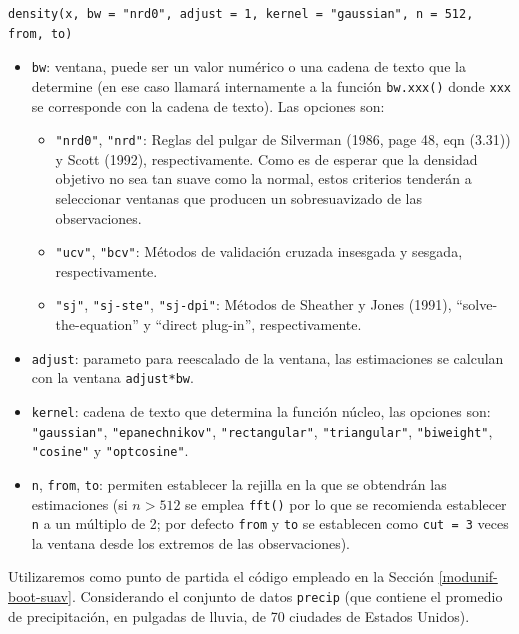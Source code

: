 \documentclass[
]{book}
\theoremstyle{break}
\theoremstyle{nonumberplain}
\begin{document}
\begin{verbatim}
density(x, bw = "nrd0", adjust = 1, kernel = "gaussian", n = 512, from, to)
\end{verbatim}

\begin{itemize}
\item
  \texttt{bw}: ventana, puede ser un valor numérico o una cadena de texto que la determine
  (en ese caso llamará internamente a la función \texttt{bw.xxx()} donde \texttt{xxx} se corresponde
  con la cadena de texto). Las opciones son:

  \begin{itemize}
  \item
    \texttt{"nrd0"}, \texttt{"nrd"}: Reglas del pulgar de Silverman (1986, page 48, eqn (3.31)) y
    Scott (1992), respectivamente. Como es de esperar que la densidad objetivo
    no sea tan suave como la normal, estos criterios tenderán a seleccionar
    ventanas que producen un sobresuavizado de las observaciones.
  \item
    \texttt{"ucv"}, \texttt{"bcv"}: Métodos de validación cruzada insesgada y sesgada, respectivamente.
  \item
    \texttt{"sj"}, \texttt{"sj-ste"}, \texttt{"sj-dpi"}: Métodos de Sheather y Jones (1991),
    ``solve-the-equation'' y ``direct plug-in'', respectivamente.
  \end{itemize}
\item
  \texttt{adjust}: parameto para reescalado de la ventana, las estimaciones se calculan
  con la ventana \texttt{adjust*bw}.
\item
  \texttt{kernel}: cadena de texto que determina la función núcleo, las opciones son: \texttt{"gaussian"},
  \texttt{"epanechnikov"}, \texttt{"rectangular"}, \texttt{"triangular"}, \texttt{"biweight"}, \texttt{"cosine"} y \texttt{"optcosine"}.
\item
  \texttt{n}, \texttt{from}, \texttt{to}: permiten establecer la rejilla en la que se obtendrán las estimaciones
  (si \(n>512\) se emplea \texttt{fft()} por lo que se recomienda establecer \texttt{n} a un múltiplo de 2;
  por defecto \texttt{from} y \texttt{to} se establecen como \texttt{cut\ =\ 3} veces la ventana desde los extremos
  de las observaciones).
\end{itemize}

Utilizaremos como punto de partida el código empleado en la Sección \ref{modunif-boot-suav}.
Considerando el conjunto de datos \texttt{precip} (que contiene el promedio de precipitación,
en pulgadas de lluvia, de 70 ciudades de Estados Unidos).
\end{document}
